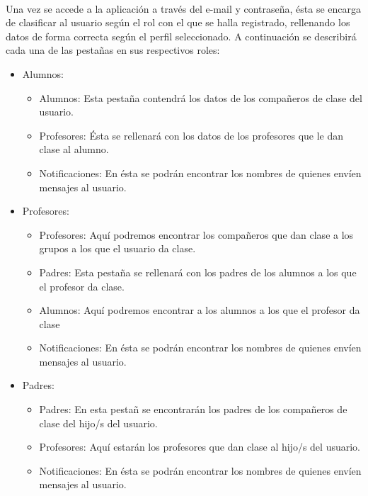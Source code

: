 \\
Una vez se accede a la aplicaci\'on a trav\'es del e-mail y contrase\~na, \'esta se encarga de clasificar al usuario seg\'un el rol con el que se halla registrado, rellenando los datos de forma correcta seg\'un el perfil seleccionado. A continuaci\'on se describir\'a cada una de las pesta\~nas en sus respectivos roles:
\\
\begin{itemize}
	\item Alumnos:
	\begin{itemize}
		\item Alumnos: Esta pesta\~na contendr\'a los datos de los compa\~neros de clase del usuario.
		\item Profesores: \'Esta se rellenar\'a con los datos de los profesores que le dan clase al alumno.
		\item Notificaciones: En \'esta se podr\'an encontrar los nombres de quienes env\'ien mensajes al usuario.
	\end{itemize}
	\item Profesores:
	\begin{itemize}
		\item Profesores: Aqu\'i podremos encontrar los compa\~neros que dan clase a los grupos a los que el usuario da clase.
		\item Padres: Esta pesta\~na se rellenar\'a con los padres de los alumnos a los que el profesor da clase.
		\item Alumnos: Aqu\'i podremos encontrar a los alumnos a los que el profesor da clase
		\item Notificaciones: En \'esta se podr\'an encontrar los nombres de quienes env\'ien mensajes al usuario.
	\end{itemize}
	\item Padres:
	\begin{itemize}
		\item Padres: En esta pesta\~n se encontrar\'an los padres de los compa\~neros de clase del hijo/s del usuario.
		\item Profesores: Aqu\'i estar\'an los profesores que dan clase al hijo/s del usuario.
		\item Notificaciones: En \'esta se podr\'an encontrar los nombres de quienes env\'ien mensajes al usuario.
	\end{itemize}
\end{itemize}

